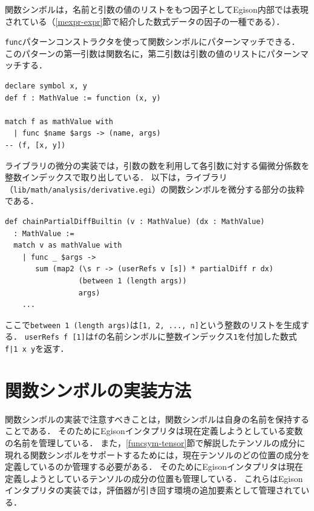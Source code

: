 関数シンボルは，名前と引数の値のリストをもつ因子としてEgison内部では表現されている（\ref{mexpr-expr}節で紹介した数式データの因子の一種である）．

\lstinline{func}パターンコンストラクタを使って関数シンボルにパターンマッチできる．
このパターンの第一引数は関数名に，第二引数は引数の値のリストにパターンマッチする．

\begin{lstlisting}[language=egison,numbers=none]
declare symbol x, y
def f : MathValue := function (x, y)

match f as mathValue with
  | func $name $args -> (name, args)
-- (f, [x, y])
\end{lstlisting}

ライブラリの微分の実装では，引数の数を利用して各引数に対する偏微分係数を整数インデックスで取り出している．
以下は，ライブラリ（\texttt{lib/math/analysis/derivative.egi}）の関数シンボルを微分する部分の抜粋である．

\begin{lstlisting}[language=egison,numbers=none]
def chainPartialDiffBuiltin (v : MathValue) (dx : MathValue)
  : MathValue :=
  match v as mathValue with
    | func _ $args ->
       sum (map2 (\s r -> (userRefs v [s]) * partialDiff r dx)
                 (between 1 (length args))
                 args)
    ...
\end{lstlisting}

ここで\lstinline{between 1 (length args)}は\lstinline{[1, 2, ..., n]}という整数のリストを生成する．
\lstinline{userRefs f [1]}は\lstinline{f}の名前シンボルに整数インデックス\lstinline{1}を付加した数式\lstinline{f|1 x y}を返す．

\section{関数シンボルの実装方法}

関数シンボルの実装で注意すべきことは，関数シンボルは自身の名前を保持することである．
そのためにEgisonインタプリタは現在定義しようとしている変数の名前を管理している．
また，\ref{funcsym-tensor}節で解説したテンソルの成分に現れる関数シンボルをサポートするためには，現在テンソルのどの位置の成分を定義しているのか管理する必要がある．
そのためにEgisonインタプリタは現在定義しようとしているテンソルの成分の位置も管理している．
これらはEgisonインタプリタの実装では，評価器が引き回す環境の追加要素として管理されている．
